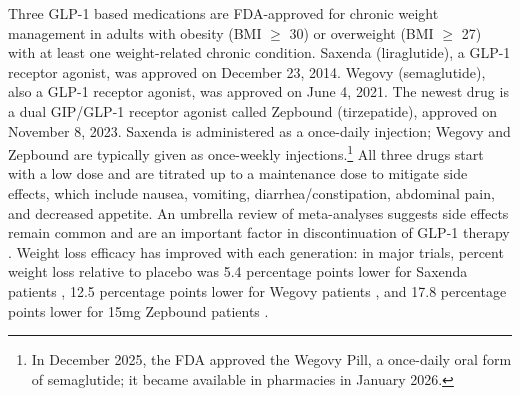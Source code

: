 Three GLP-1 based medications are FDA-approved for chronic weight management in adults with obesity (BMI $\ge$ 30) or overweight (BMI $\ge$ 27) with at least one weight-related chronic condition. Saxenda (liraglutide), a GLP-1 receptor agonist, was approved on December 23, 2014. Wegovy (semaglutide), also a GLP-1 receptor agonist, was approved on June 4, 2021. The newest drug is a dual GIP/GLP-1 receptor agonist called Zepbound (tirzepatide), approved on November 8, 2023. Saxenda is administered as a once-daily injection; Wegovy and Zepbound are typically given as once-weekly injections.\footnote{In December 2025, the FDA approved the Wegovy Pill, a once-daily oral form of semaglutide; it became available in pharmacies in January 2026. } All three drugs start with a low dose and are titrated up to a maintenance dose to mitigate side effects, which include nausea, vomiting, diarrhea/constipation, abdominal pain, and decreased appetite. An umbrella review of meta-analyses suggests side effects remain common and are an important factor in discontinuation of GLP-1 therapy \citep{kong2026glp1umbrella}. Weight loss efficacy has improved with each generation: in major trials, percent weight loss relative to placebo was 5.4 percentage points lower for Saxenda patients \citep{pi2015randomized}, 12.5 percentage points lower for Wegovy patients \citep{Wilding2021}, and 17.8 percentage points lower for 15mg Zepbound patients \citep{Jastreboff2022}.

